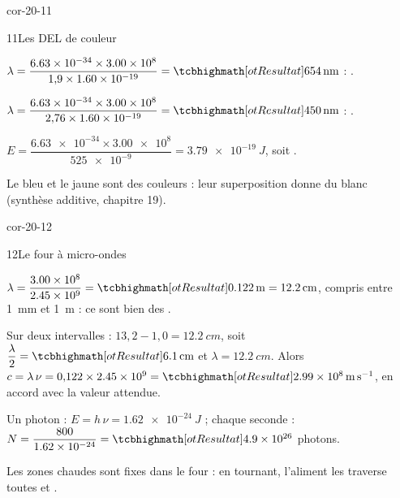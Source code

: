 \begin{blocLivre}{cor-20-11}
\begin{corrige}{11}{Les DEL de couleur}
\begin{questions}
\item $\lambda=\dfrac{\num{6,63e-34}\times\num{3,00e8}}{1{,}9\times\num{1,60e-19}}=\res{\qty{654}{nm}}$ : .
\item $\lambda=\dfrac{\num{6,63e-34}\times\num{3,00e8}}{2{,}76\times\num{1,60e-19}}=\res{\qty{450}{nm}}$ : .
\item $E=\dfrac{\num{6,63e-34}\times\num{3,00e8}}{\num{525e-9}}=\qty{3,79e-19}{J}$, soit .
\item Le bleu et le jaune sont des couleurs  : leur superposition donne du blanc (synthèse additive, chapitre 19).
\end{questions}
\end{corrige}
\end{blocLivre}
\begin{blocLivre}{cor-20-12}
\begin{corrige}{12}{Le four à micro-ondes}
\begin{questions}
\item $\lambda=\dfrac{\num{3,00e8}}{\num{2,45e9}}=\res{\qty{0,122}{m}}=\qty{12,2}{cm}$, compris entre \qty{1}{mm} et \qty{1}{m} : ce sont bien des .
\item Sur deux intervalles : $13{,}2-1{,}0=\qty{12,2}{cm}$, soit $\dfrac{\lambda}{2}=\res{\qty{6,1}{cm}}$ et $\lambda=\qty{12,2}{cm}$. Alors
$c=\lambda\,\nu=0{,}122\times\num{2,45e9}=\res{\qty{2,99e8}{m.s^{-1}}}$, en accord avec la valeur attendue.
\item Un photon : $E=h\,\nu=\qty{1,62e-24}{J}$ ; chaque seconde : $N=\dfrac{800}{\num{1,62e-24}}=\res{\num{4,9e26}}$ photons.
\item Les zones chaudes sont fixes dans le four : en tournant, l'aliment les traverse toutes et .
\end{questions}
\end{corrige}
\end{blocLivre}
